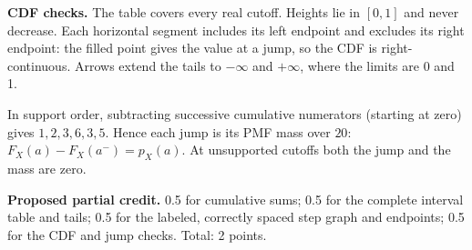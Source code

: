 \begin{center}\end{center}

\textbf{CDF checks.} The table covers every real cutoff. Heights lie in $[0,1]$ and never decrease. Each horizontal segment includes its left endpoint and excludes its right endpoint: the filled point gives the value at a jump, so the CDF is right-continuous. Arrows extend the tails to $-\infty$ and $+\infty$, where the limits are 0 and 1.

In support order, subtracting successive cumulative numerators (starting at zero) gives $1,2,3,6,3,5$. Hence each jump is its PMF mass over $20$: $F_X(a)-F_X(a^-)=p_X(a)$. At unsupported cutoffs both the jump and the mass are zero.

\textbf{Proposed partial credit.} 0.5 for cumulative sums; 0.5 for the complete interval table and tails; 0.5 for the labeled, correctly spaced step graph and endpoints; 0.5 for the CDF and jump checks. Total: 2 points.

\par\vspace{3mm}\secInicio[][sec:q5]

